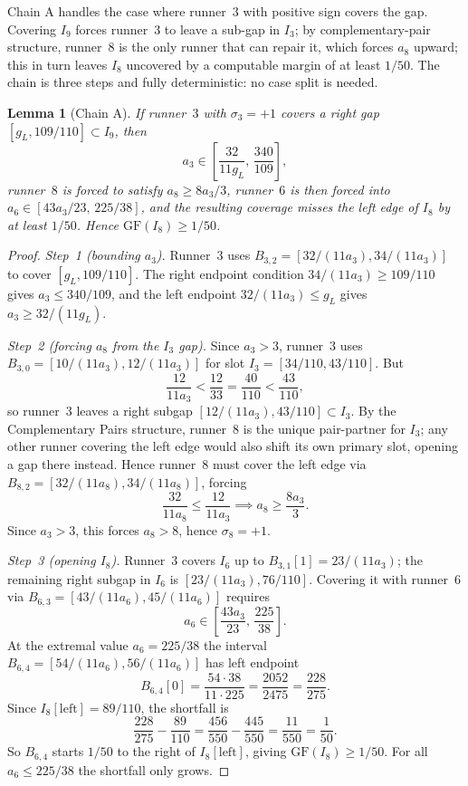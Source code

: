 \documentclass[12pt,a4paper]{amsart}
\newtheorem{lemma}[theorem]{Lemma}
\theoremstyle{definition}
\theoremstyle{remark}
\newcommand{\GF}{\mathrm{GF}}
\begin{document}
Chain A handles the case where runner~3 with positive sign covers the gap. Covering $I_9$
forces runner~3 to leave a sub-gap in $I_3$; by complementary-pair structure, runner~8 is
the only runner that can repair it, which forces $a_8$ upward; this in turn leaves $I_8$
uncovered by a computable margin of at least $1/50$. The chain is three steps and fully
deterministic: no case split is needed.

\begin{lemma}[Chain A]\label{lem:chainA}
If runner~$3$ with $\sigma_3=+1$ covers a right gap $[g_L,109/110]\subset I_9$, then
\[
  a_3 \in \left[\frac{32}{11g_L},\,\frac{340}{109}\right],
\]
runner~$8$ is forced to satisfy $a_8\ge 8a_3/3$, runner~$6$ is then forced into
$a_6\in[43a_3/23,\,225/38]$, and the resulting coverage misses the left edge of $I_8$ by
at least $1/50$. Hence $\GF(I_8)\ge 1/50$.
\end{lemma}

\begin{proof}
\textit{Step~1 (bounding $a_3$).} Runner~3 uses $B_{3,2}=[32/(11a_3),34/(11a_3)]$
to cover $[g_L,109/110]$. The right endpoint condition $34/(11a_3)\ge 109/110$
gives $a_3\le 340/109$, and the left endpoint $32/(11a_3)\le g_L$
gives $a_3\ge 32/(11g_L)$.

\textit{Step~2 (forcing $a_8$ from the $I_3$ gap).} Since $a_3>3$, runner~3 uses
$B_{3,0}=[10/(11a_3),12/(11a_3)]$ for slot $I_3=[34/110,43/110]$. But
\[
  \frac{12}{11a_3} < \frac{12}{33} = \frac{40}{110} < \frac{43}{110},
\]
so runner~3 leaves a right subgap $[12/(11a_3),43/110]\subset I_3$. By the Complementary
Pairs structure, runner~8 is the unique pair-partner for $I_3$; any other runner covering
the left edge would also shift its own primary slot, opening a gap there instead.
Hence runner~8 must cover the left edge via $B_{8,2}=[32/(11a_8),34/(11a_8)]$, forcing
\[
  \frac{32}{11a_8} \le \frac{12}{11a_3} \implies a_8 \ge \frac{8a_3}{3}.
\]
Since $a_3>3$, this forces $a_8>8$, hence $\sigma_8=+1$.

\textit{Step~3 (opening $I_8$).} Runner~3 covers $I_6$ up to $B_{3,1}[1]=23/(11a_3)$;
the remaining right subgap in $I_6$ is $[23/(11a_3),76/110]$. Covering it with runner~6
via $B_{6,3}=[43/(11a_6),45/(11a_6)]$ requires
\[
  a_6 \in \left[\frac{43a_3}{23},\,\frac{225}{38}\right].
\]
At the extremal value $a_6=225/38$ the interval $B_{6,4}=[54/(11a_6),56/(11a_6)]$ has left
endpoint
\[
  B_{6,4}[0] = \frac{54\cdot 38}{11\cdot 225} = \frac{2052}{2475} = \frac{228}{275}.
\]
Since $I_8[\mathrm{left}]=89/110$, the shortfall is
\[
  \frac{228}{275} - \frac{89}{110}
  = \frac{456}{550} - \frac{445}{550}
  = \frac{11}{550} = \frac{1}{50}.
\]
So $B_{6,4}$ starts $1/50$ to the right of $I_8[\mathrm{left}]$, giving $\GF(I_8)\ge 1/50$.
For all $a_6\le 225/38$ the shortfall only grows.
\end{proof}
\end{document}
